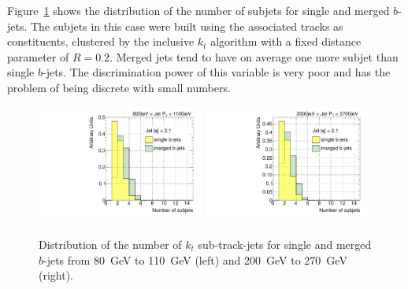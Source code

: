 
Figure~\ref{fig:nsubjetsinglemerged} shows the distribution of the number of subjets for single and merged $b$-jets. The subjets in this case were built using the associated tracks as constituents, clustered by the inclusive $k_t$ algorithm with a fixed distance parameter of $R=0.2$.  Merged jets tend to have on average one more subjet than single $b$-jets. The discrimination power of this variable is %
 very poor and has the problem of being discrete with small numbers.

\begin{figure}[tp]
\centering
\includegraphics[width=0.49\textwidth]{FIGS/VarsSingleMerged/Nsubjets080.pdf}
\includegraphics[width=0.49\textwidth]{FIGS/VarsSingleMerged/Nsubjets200.pdf}
\caption{Distribution of the number of $k_t$ sub-track-jets for single and merged $b$-jets from 80~GeV to 110~GeV (left) and 200~GeV to 270~GeV (right).}
\label{fig:nsubjetsinglemerged}
\end{figure}


